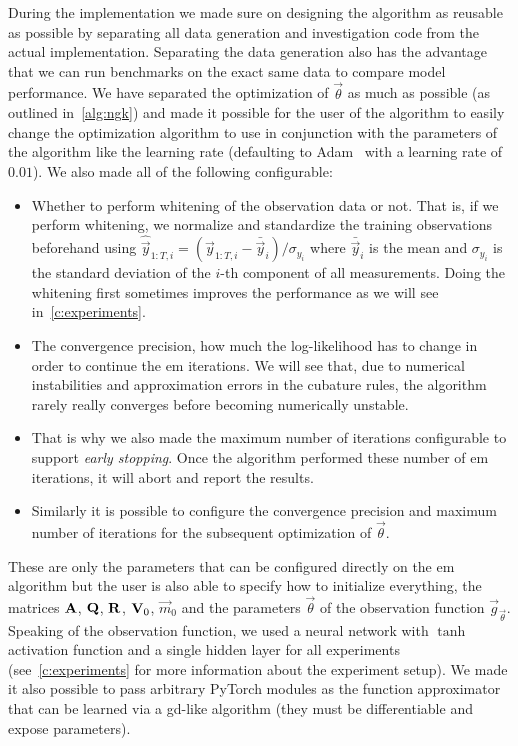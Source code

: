 	During the implementation we made sure on designing the algorithm as reusable as possible by separating all data generation and investigation code from the actual implementation. Separating the data generation also has the advantage that we can run benchmarks on the exact same data to compare model performance. We have separated the optimization of \(\vec{\theta}\) as much as possible (as outlined in~\autoref{alg:ngk}) and made it possible for the user of the algorithm to easily change the optimization algorithm to use in conjunction with the parameters of the algorithm like the learning rate (defaulting to Adam~\cite{kingmaAdamMethodStochastic2017} with a learning rate of \( 0.01 \)). We also made all of the following configurable:
	\begin{itemize}
		\item Whether to perform whitening of the observation data or not. That is, if we perform whitening, we normalize and standardize the training observations beforehand using \( \hat{\vec{y}}_{1:T, i} = (\vec{y}_{1:T, i} - \bar{\vec{y}}_i) / \sigma_{y_i} \) where \( \bar{\vec{y}}_i \) is the mean and \( \sigma_{y_i} \) is the standard deviation of the \(i\)-th component of all measurements. Doing the whitening first sometimes improves the performance as we will see in~\ref{c:experiments}.
		\item The convergence precision, \ie how much the log-likelihood has to change in order to continue the \ac{em} iterations. We will see that, due to numerical instabilities and approximation errors in the cubature rules, the algorithm rarely really converges before becoming numerically unstable.
		\item[] That is why we also made the maximum number of iterations configurable to support \emph{early stopping}. Once the algorithm performed these number of \ac{em} iterations, it will abort and report the results.
		\item Similarly it is possible to configure the convergence precision and maximum number of iterations for the subsequent optimization of \(\vec{\theta}\).
	\end{itemize}
	These are only the parameters that can be configured directly on the \ac{em} algorithm but the user is also able to specify how to initialize everything, \ie the matrices \( \boldsymbol{\mathrm{A}} \), \( \boldsymbol{\mathrm{Q}} \), \( \boldsymbol{\mathrm{R}} \), \( \boldsymbol{\mathrm{V}}_0 \), \( \vec{m}_0 \) and the parameters \( \vec{\theta} \) of the observation function \( \vec{g}_{\vec{\theta}} \). Speaking of the observation function, we used a neural network with \( \tanh \) activation function and a single hidden layer for all experiments (see~\autoref{c:experiments} for more information about the experiment setup). We made it also possible to pass arbitrary PyTorch modules as the function approximator that can be learned via a \ac{gd}-like algorithm (\ie they must be differentiable and expose parameters).

